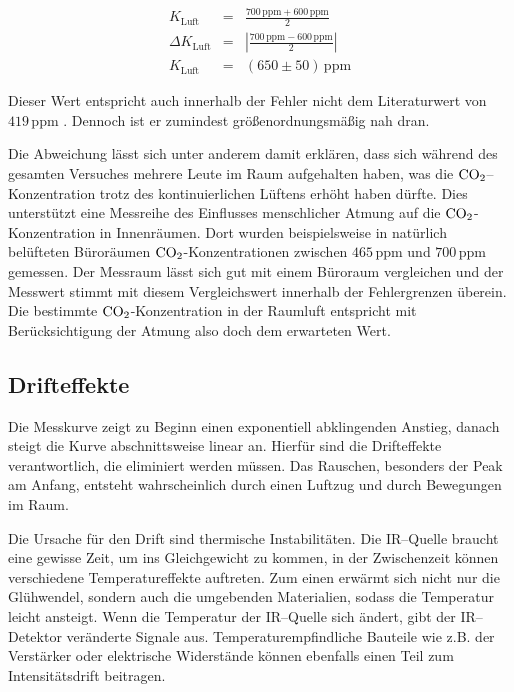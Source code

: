 \documentclass[12pt,a4paper]{scrartcl}
\numberwithin{equation}{section} %
\begin{document}
\begin{eqnarray}
  K_\mathrm{Luft} &=& \frac{700 \mathrm{\, ppm} + 600 \mathrm{\, ppm}}{2} \\
  \Delta K_\mathrm{Luft} &=& \left|\frac{700 \mathrm{\, ppm} - 600 \mathrm{\, ppm}}{2}\right| \\
  K_\mathrm{Luft} &=& (650 \pm 50) \mathrm{\, ppm}
\end{eqnarray}

Dieser Wert entspricht auch innerhalb der Fehler nicht dem Literaturwert von $419 \mathrm{\, ppm}$ \cite{Kohlendioxid Anteil}. Dennoch ist er zumindest größenordnungsmäßig nah dran.

Die Abweichung lässt sich unter anderem damit erklären, dass sich während des gesamten Versuches mehrere Leute im Raum aufgehalten haben, was die $\ce{CO_2}$--Konzentration trotz des kontinuierlichen Lüftens erhöht haben dürfte. Dies unterstützt eine Messreihe des Einflusses menschlicher Atmung auf die $\ce{CO_2}$-Konzentration in Innenräumen. \cite{Kohlendioxid Innenraum} Dort wurden beispielsweise in natürlich belüfteten Büroräumen $\ce{CO_2}$-Konzentrationen zwischen $465 \mathrm{\, ppm}$ und $700 \mathrm{\, ppm}$ gemessen. Der Messraum lässt sich gut mit einem Büroraum vergleichen und der Messwert stimmt mit diesem Vergleichswert innerhalb der Fehlergrenzen überein. Die bestimmte $\ce{CO_2}$-Konzentration in der Raumluft entspricht mit Berücksichtigung der Atmung also doch dem erwarteten Wert.

\subsection{Drifteffekte}
\label{Drifteffekte}

Die Messkurve zeigt zu Beginn einen exponentiell abklingenden Anstieg, danach steigt die Kurve abschnittsweise linear an. Hierfür sind die Drifteffekte verantwortlich, die eliminiert werden müssen. Das Rauschen, besonders der Peak am Anfang, entsteht wahrscheinlich durch einen Luftzug und durch Bewegungen im Raum.

Die Ursache für den Drift sind thermische Instabilitäten. Die IR--Quelle braucht eine gewisse Zeit, um ins Gleichgewicht zu kommen, in der Zwischenzeit können verschiedene Temperatureffekte auftreten. Zum einen erwärmt sich nicht nur die Glühwendel, sondern auch die umgebenden Materialien, sodass die Temperatur leicht ansteigt. Wenn die Temperatur der IR--Quelle sich ändert, gibt der IR--Detektor veränderte Signale aus. Temperaturempfindliche Bauteile wie z.B. der Verstärker oder elektrische Widerstände können ebenfalls einen Teil zum Intensitätsdrift beitragen.
\end{document}
